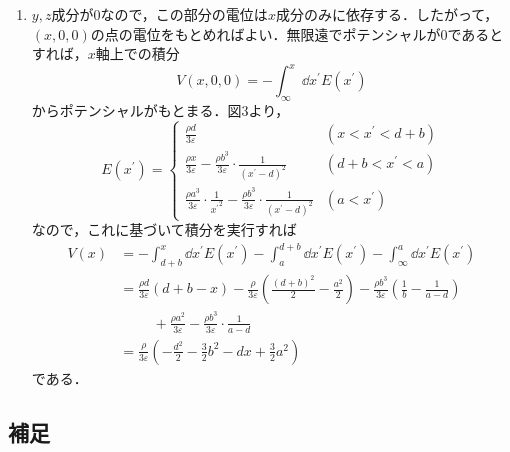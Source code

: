 \documentclass[a4paper,pdflatex,ja=standard]{bxjsarticle}
\begin{document}
\begin{enumerate}
  \item 
  $y,z$成分が$0$なので，この部分の電位は$x$成分のみに依存する．したがって，$(x,0,0)$の点の電位をもとめればよい．無限遠でポテンシャルが$0$であるとすれば，$x$軸上での積分
  \begin{equation}
    V(x,0,0)
    =
    -\int_{\infty}^{x}
    \dd x^{\prime}
    E(x^{\prime})
  \end{equation}
  からポテンシャルがもとまる．図3より，
  \begin{equation}
    E(x^{\prime})
    =
    \left\{
      \begin{alignedat}{1}
        \frac{\rho d}{3\varepsilon} & (x<x^{\prime}<d+b) \\
        \frac{\rho x}{3\varepsilon}
        -
        \frac{\rho b^3}{3\varepsilon}
        \cdot
        \frac{1}{(x^{\prime}-d)^2}
        & (d+b<x^{\prime}<a)
        \\
        \frac{\rho a^{3}}{3\varepsilon}
        \cdot
        \frac{1}{{x^{\prime}}^2}
        -
        \frac{\rho b^3}{3\varepsilon}
        \cdot
        \frac{1}{(x^{\prime}-d)^2}
        & (a<x^{\prime})
      \end{alignedat}
    \right.
  \end{equation}
  なので，これに基づいて積分を実行すれば
  \begin{align}
    V(x)
    &=
    -\int_{d+b}^{x}
    \dd x^{\prime}
    E(x^{\prime})
    -\int_{a}^{d+b}
    \dd x^{\prime}
    E(x^{\prime})
    -\int_{\infty}^{a}
    \dd x^{\prime}
    E(x^{\prime})
    \nonumber
    \\
    &=
    \frac{\rho d}{3\varepsilon}(d+b-x)
    -
    \frac{\rho}{3\varepsilon}
    \left(  
      \frac{(d+b)^2}{2}
      -
      \frac{a^2}{2}
    \right)
    -
    \frac{\rho b^3}{3\varepsilon}
    \left(  
      \frac{1}{b}
      -
      \frac{1}{a-d}
    \right)
    \nonumber
    \\
    &\hspace{1cm}
    +\frac{\rho a^2}{3\varepsilon}
    -
    \frac{\rho b^3}{3\varepsilon}
    \cdot
    \frac{1}{a-d}
    \\
    &=
    \frac{\rho}{3\varepsilon}
    \left(  
      -\frac{d^2}{2}-\frac{3}{2}b^2
      -
      dx
      +
      \frac{3}{2}a^2
    \right)
    \label{ele_field}
  \end{align}
  である．

\end{enumerate}

\subsection*{補足}
\end{document}
